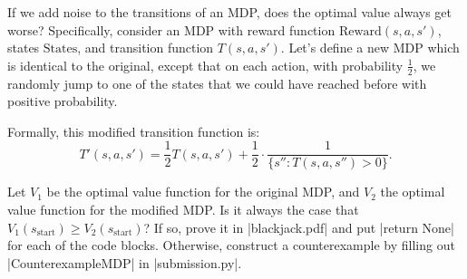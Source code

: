 \item {}
If we add noise to the transitions of an MDP, does the optimal value always get
worse? Specifically, consider an MDP with reward function $\text{Reward}
(s,a,s')$, states $\text{States}$, and transition function $T(s,a,s')$.  Let's
define a new MDP which is identical to the original, except that on each action,
with probability $\frac{1}{2}$, we randomly jump to one of the states that we
could have reached before with positive probability.

Formally, this modified transition function is:
\[T'(s,a,s')= \frac{1}{2} T(s,a,s') + \frac{1}{2} \cdot \frac{1}{\{ s'' : T(s, a, s'') > 0\}}.\]

Let $V_1$ be the optimal value function for the original MDP, and $V_2$ the
optimal value function for the modified MDP. Is it always the case that $V_1
(s_\text{start})\geq V_2(s_\text{start})$?  If so, prove it in |blackjack.pdf|
and put |return None| for each of the code blocks. Otherwise, construct a
counterexample by filling out |CounterexampleMDP| in |submission.py|.
